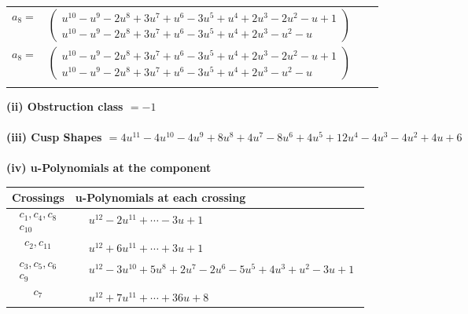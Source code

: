 \documentclass[1p]{elsarticle_modified}
\theoremstyle{definition}
\begin{document}
\begin{tabular}{m{7pt} m{180pt} m{7pt} m{180pt} }
\flushright $a_{8}=$&$\begin{pmatrix}u^{10}- u^9-2 u^8+3 u^7+u^6-3 u^5+u^4+2 u^3-2 u^2- u+1\\u^{10}- u^9-2 u^8+3 u^7+u^6-3 u^5+u^4+2 u^3- u^2- u\end{pmatrix}$\\ \flushright $a_{8}=$&$\begin{pmatrix}u^{10}- u^9-2 u^8+3 u^7+u^6-3 u^5+u^4+2 u^3-2 u^2- u+1\\u^{10}- u^9-2 u^8+3 u^7+u^6-3 u^5+u^4+2 u^3- u^2- u\end{pmatrix}$\\&\end{tabular}
\flushleft \textbf{(ii) Obstruction class $= -1$}\\~\\
\flushleft \textbf{(iii) Cusp Shapes $= 4 u^{11}-4 u^{10}-4 u^9+8 u^8+4 u^7-8 u^6+4 u^5+12 u^4-4 u^3-4 u^2+4 u+6$}\\~\\
\newpage\renewcommand{\arraystretch}{1}
\flushleft \textbf{(iv) u-Polynomials at the component}\newline \\
\begin{tabular}{m{50pt}|m{274pt}}
Crossings & \hspace{64pt}u-Polynomials at each crossing \\
\hline $$\begin{aligned}c_{1},c_{4},c_{8}\\c_{10}\end{aligned}$$&$\begin{aligned}
&u^{12}-2 u^{11}+\cdots-3 u+1
\end{aligned}$\\
\hline $$\begin{aligned}c_{2},c_{11}\end{aligned}$$&$\begin{aligned}
&u^{12}+6 u^{11}+\cdots+3 u+1
\end{aligned}$\\
\hline $$\begin{aligned}c_{3},c_{5},c_{6}\\c_{9}\end{aligned}$$&$\begin{aligned}
&u^{12}-3 u^{10}+5 u^8+2 u^7-2 u^6-5 u^5+4 u^3+u^2-3 u+1
\end{aligned}$\\
\hline $$\begin{aligned}c_{7}\end{aligned}$$&$\begin{aligned}
&u^{12}+7 u^{11}+\cdots+36 u+8
\end{aligned}$\\
\hline
\end{tabular}\\~\\
\end{document}
